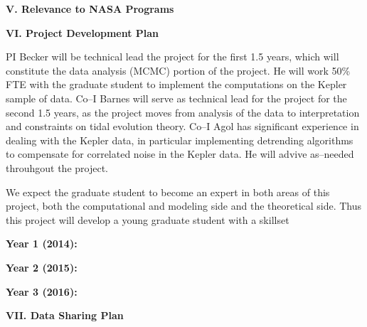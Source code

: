 \bigskip
\centerline{\bf V. Relevance to NASA Programs}
\smallskip

\bigskip
\centerline{\bf VI. Project Development Plan}
\smallskip

PI Becker will be technical lead the project for the first 1.5 years,
which will constitute the data analysis (MCMC) portion of the project.
He will work 50\% FTE with the graduate student to implement the
computations on the Kepler sample of data.  Co--I Barnes will serve as
technical lead for the project for the second 1.5 years, as the
project moves from analysis of the data to interpretation and
constraints on tidal evolution theory.  Co--I Agol has significant
experience in dealing with the Kepler data, in particular implementing
detrending algorithms to compensate for correlated noise in the Kepler
data.  He will advive as--needed throuhgout the project.

We expect the graduate student to become an expert in both areas of
this project, both the computational and modeling side and the
theoretical side.  Thus this project will develop a young graduate
student with a skillset 

{\bf Year 1 (2014):} 

{\bf Year 2 (2015):} 

{\bf Year 3 (2016):} 


\bigskip
\centerline{\bf VII. Data Sharing Plan}
\smallskip
